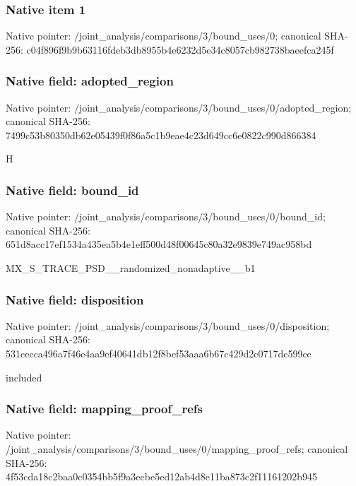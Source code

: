 \documentclass[10pt,a4paper]{article}
\begin{document}
\subsubsection{Native item 1}
Native pointer: /joint\_\allowbreak{}analysis/comparisons/3/bound\_\allowbreak{}uses/0; canonical SHA-256: c04f896f9b9b63116fdeb3db8955b4e6232d5e34c8057cb982738baeefca245f

\subsubsection{Native field: adopted\_\allowbreak{}region}
Native pointer: /joint\_\allowbreak{}analysis/comparisons/3/bound\_\allowbreak{}uses/0/adopted\_\allowbreak{}region; canonical SHA-256: 7499c53b80350db62e05439f0f86a5c1b9eae4c23d649cc6e0822c990d866384

\begingroup\raggedright\sloppy H\par\endgroup

\subsubsection{Native field: bound\_\allowbreak{}id}
Native pointer: /joint\_\allowbreak{}analysis/comparisons/3/bound\_\allowbreak{}uses/0/bound\_\allowbreak{}id; canonical SHA-256: 651d8acc17ef1534a435ea5b4e1eff500d48f00645c80a32e9839e749ac958bd

\begingroup\raggedright\sloppy MX\_\allowbreak{}S\_\allowbreak{}TRACE\_\allowbreak{}PSD\_\allowbreak{}\_\allowbreak{}randomized\_\allowbreak{}nonadaptive\_\allowbreak{}\_\allowbreak{}b1\par\endgroup

\subsubsection{Native field: disposition}
Native pointer: /joint\_\allowbreak{}analysis/comparisons/3/bound\_\allowbreak{}uses/0/disposition; canonical SHA-256: 531cecca496a7f46e4aa9ef40641db12f8bef53aaa6b67c429d2c0717dc599ce

\begingroup\raggedright\sloppy included\par\endgroup

\subsubsection{Native field: mapping\_\allowbreak{}proof\_\allowbreak{}refs}
Native pointer: /joint\_\allowbreak{}analysis/comparisons/3/bound\_\allowbreak{}uses/0/mapping\_\allowbreak{}proof\_\allowbreak{}refs; canonical SHA-256: 4f53cda18c2baa0c0354bb5f9a3ecbe5ed12ab4d8e11ba873c2f11161202b945
\end{document}
